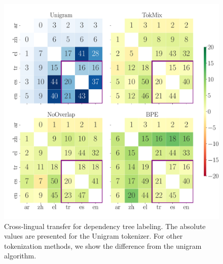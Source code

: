 \begin{figure}[tb!]
    \centering
    \includegraphics[width=1.0\linewidth]{figures/UD_F1_transfer_.pdf}
    
    \caption{Cross-lingual transfer for dependency tree labeling. The absolute values are presented for the Unigram tokenizer. For other tokenization methods, we show  the difference from the unigram algorithm.}
    \label{fig:pos_transfer}
\end{figure}